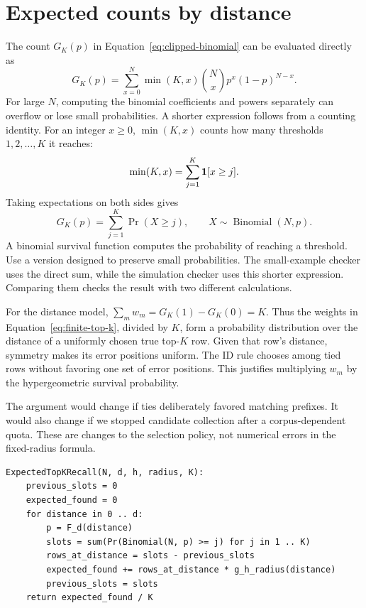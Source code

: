 \section{Expected counts by distance}
\label{sec:finite-distance-details}
The count $G_K(p)$ in Equation~\eqref{eq:clipped-binomial} can be evaluated directly as
\[
G_K(p)=\sum_{x=0}^{N}\min(K,x)\binom Nx p^x(1-p)^{N-x}.
\]
For large $N$, computing the binomial coefficients and powers separately can overflow or lose
small probabilities. A shorter expression follows from a counting identity. For an integer
$x\ge0$, $\min(K,x)$ counts how many thresholds $1,2,\ldots,K$ it reaches:
\[
\min(K,x)=\sum_{j=1}^{K}\mathbf 1[x\ge j].
\]
Taking expectations on both sides gives
\begin{equation}
G_K(p)=\sum_{j=1}^{K}\Pr(X\ge j),\qquad X\sim\operatorname{Binomial}(N,p).
\label{eq:clipped-survival}
\end{equation}
A binomial survival function computes the probability of reaching a threshold. Use a
version designed to preserve small probabilities. The small-example checker uses the
direct sum, while the simulation checker uses this shorter expression. Comparing them
checks the result with two different calculations.

For the distance model, $\sum_m w_m=G_K(1)-G_K(0)=K$. Thus the weights in
Equation~\eqref{eq:finite-top-k}, divided by $K$, form a probability distribution over the
distance of a uniformly chosen true top-$K$ row. Given that row's distance, symmetry makes
its error positions uniform. The ID rule chooses among tied rows without favoring one set of
error positions. This justifies multiplying $w_m$ by the hypergeometric survival probability.

The argument would change if ties deliberately favored matching prefixes. It would also change
if we stopped candidate collection after a corpus-dependent quota. These are changes to the
selection policy, not numerical errors in the fixed-radius formula.

\par\noindent\begin{minipage}{\linewidth}
\begin{lstlisting}[caption={Expected top-K recall for a fixed prefix radius.}]
ExpectedTopKRecall(N, d, h, radius, K):
    previous_slots = 0
    expected_found = 0
    for distance in 0 .. d:
        p = F_d(distance)
        slots = sum(Pr(Binomial(N, p) >= j) for j in 1 .. K)
        rows_at_distance = slots - previous_slots
        expected_found += rows_at_distance * g_h_radius(distance)
        previous_slots = slots
    return expected_found / K
\end{lstlisting}
\end{minipage}\par

